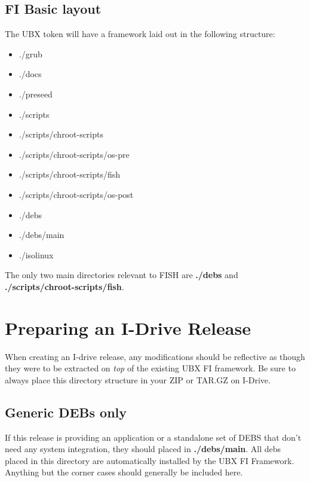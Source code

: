 \documentclass[letterpaper,10pt,titlepage]{article}
\begin{document}
\subsection{FI Basic layout}
The UBX token will have a framework laid out in the following structure:
\begin{itemize}
\item ./grub
\item ./docs
\item ./preseed
\item ./scripts
\item ./scripts/chroot-scripts
\item ./scripts/chroot-scripts/os-pre
\item ./scripts/chroot-scripts/fish
\item ./scripts/chroot-scripts/os-post
\item ./debs
\item ./debs/main
\item ./isolinux
\end{itemize}

The only two main directories relevant to FISH are \textbf{./debs} and \textbf{./scripts/chroot-scripts/fish}.

\section{Preparing an I-Drive Release}
When creating an I-drive release, any modifications should be reflective as though they were to be extracted on \textit{top} of  the existing UBX FI framework.  Be sure to always place this directory structure in your ZIP or TAR.GZ on I-Drive.

\subsection{Generic DEBs only}
If this release is providing an application or a standalone set of DEBS that don't need any system integration, they should placed in
\textbf{./debs/main}.  All debs placed in this directory are automatically installed by the UBX FI Framework.
Anything but the corner cases should generally be included here.  
\end{document}
